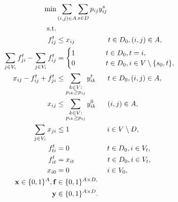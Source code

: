     \begin{subequations}
    \begin{flalign}
  \min &  \sum\limits_{(i,j) \in A} \sum\limits_{s \in D} p_{ij} y^s_{ij}    \\  \notag  
		   \text{s.t.}&                  && \\	\ 
\label{con:pf1:xfrel}  f^{t}_{ij}   &\leq x_{ij}    ~~ \qquad \qquad t\in D_0, (i,j)\in A, \\
 \label{con:pf1:flow}  \sum\limits_{\substack{ j \in V_i }}f^{t}_{ji}-\sum\limits_{\substack{j\in V_i}}f^{t}_{ij}    & = \begin{cases}
    1~~~~&  t\in D_0, t = i, \\        0~~~~ \qquad             & t\in D_0, i\in V\setminus \{s_0, t\},\end{cases}     \\	
\label{con:pf1:yvar} x_{ij} -f^t_{ij}+f^t_{ji}  &\leq \sum\limits_{\substack{k\in V: \\ p_{ik}\geq p_{ij}}}y^t_{ik}   ~~\quad  t\in D_0, (i,j)\in A, \\  		
\label{con:pf1:yvar0} x_{ij} &\leq \sum\limits_{\substack{k\in V: \\ p_{ik}\geq p_{ij}}}y^0_{ik}   ~~\quad  (i,j)\in A, \\  		
\label{con:pf1:B}  \sum_{j\in V_i}x_{ji}&\leq 1~~~~ \qquad  \qquad i\in V\setminus D,\\
\label{con:pf1:noflowFromT} f_{ti}^t&=0 ~~~~ \qquad  \qquad t\in D_0, i\in V_t,   \\
\label{con:pf1:fitt=xit} f_{it}^t&=x_{it} ~~ \qquad  \qquad t\in D_0, i\in V_t, \\
\label{con:pf1:xi0=0} x_{i0}&=0 ~~~~ \qquad  \qquad i\in V_0, \\
\label{con:pf1:dim}	\mathbf{x} \in \{0,1\}^{A},\mathbf{f}&\in\{0,1\}^{A \times D,} \\ 
\label{con:pf1:dimy} \mathbf{y}&\in \{0,1\}^{A\times D}.
    \end{flalign}~
    \end{subequations}
    
